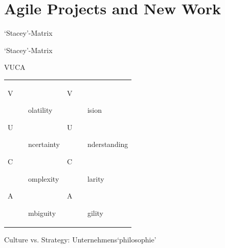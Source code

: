 \section{Agile Projects and New Work}


\begin{frame}{`Stacey'-Matrix}
        \end{frame}

\begin{frame}{`Stacey'-Matrix}        
        
\end{frame}

\begin{frame}{VUCA}
    \begin{tabular}{ll}
    \begin{minipage}{4cm}
        \begin{description}
            \item[V]olatility
            \item[U]ncertainty
            \item[C]omplexity
            \item[A]mbiguity
        \end{description}
    \end{minipage}
         &  
    \begin{minipage}{6cm}
        \begin{description}
            \item[V]ision
            \item[U]nderstanding
            \item[C]larity
            \item[A]gility
        \end{description}
    \end{minipage}
\end{tabular}
\end{frame}


\begin{frame}{Culture vs. Strategy: Unternehmens`philosophie'}
    
\end{frame}



